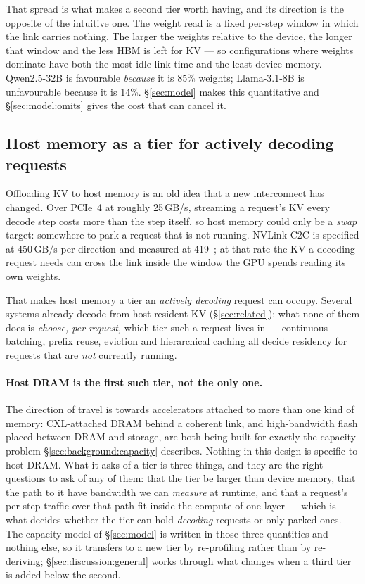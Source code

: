 That spread is what makes a second tier worth having, and its direction is the
opposite of the intuitive one. The weight read is a fixed per-step window in
which the link carries nothing. The larger the weights relative to the device,
the longer that window and the less HBM is left for KV --- so configurations
where weights dominate have both the most idle link time and the least device
memory. Qwen2.5-32B is favourable \emph{because} it is 85\% weights;
Llama-3.1-8B is unfavourable because it is 14\%. \S\ref{sec:model} makes this
quantitative and \S\ref{sec:model:omits} gives the cost that can cancel it.

\subsection{Host memory as a tier for actively decoding requests}

Offloading KV to host memory is an old idea that a new interconnect has changed.
Over PCIe~4 at roughly 25\,GB/s, streaming a request's KV every decode step
costs more than the step itself, so host memory could only be a \emph{swap}
target: somewhere to park a request that is not running. NVLink-C2C is specified
at 450\,GB/s per direction and measured at 419~\cite{pie}; at that rate the KV a
decoding request needs can cross the link inside the window the GPU spends
reading its own weights.

That makes host memory a tier an \emph{actively decoding} request can occupy.
Several systems already decode from host-resident KV
(\S\ref{sec:related}); what none of them does is \emph{choose, per request,}
which tier such a request lives in --- continuous batching, prefix reuse,
eviction and hierarchical caching all decide residency for requests that are
\emph{not} currently running.

\paragraph{Host DRAM is the first such tier, not the only one.} The direction of
travel is towards accelerators attached to more than one kind of memory:
CXL-attached DRAM behind a coherent link, and high-bandwidth flash placed
between DRAM and storage, are both being built for exactly the capacity problem
\S\ref{sec:background:capacity} describes. Nothing in this design is specific to
host DRAM. What it asks of a tier is three things, and they are the right
questions to ask of any of them: that the tier be larger than device memory,
that the path to it have bandwidth we can \emph{measure} at runtime, and that a
request's per-step traffic over that path fit inside the compute of one
layer --- which is what decides whether the tier can hold \emph{decoding}
requests or only parked ones. The capacity model of \S\ref{sec:model} is written
in those three quantities and nothing else, so it transfers to a new tier by
re-profiling rather than by re-deriving; \S\ref{sec:discussion:general} works
through what changes when a third tier is added below the second.

